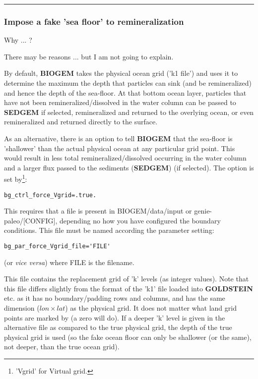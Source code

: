 %
\noindent\rule{4cm}{0.5pt}
\subsubsection{Impose a fake 'sea floor' to remineralization}
\vspace{1mm}

Why ... ?

\noindent There may be reasons ... but I am not going to explain.

By default, \textbf{BIOGEM} takes the physical ocean grid ('k1 file') and uses it to determine the maximum the depth that particles can sink (and be remineralized) and hence the depth of the sea-floor. At that bottom ocean layer, particles that have not been remineralized/dissolved in the water column can be passed to \textbf{SEDGEM} if selected, remineralized and returned to the overlying ocean, or even remineralized and returned directly to the surface.

As an alternative, there is an option to tell \textbf{BIOGEM} that the sea-floor is 'shallower' than the actual physical ocean at any particular grid point. This would result in less total remineralized/dissolved occurring in the water column and a larger flux passed to the sediments (\textbf{SEDGEM}) (if selected). The option is set by\footnote{'Vgrid' for Virtual grid.}:
\vspace{-1mm}\small\begin{verbatim}
bg_ctrl_force_Vgrid=.true.
\end{verbatim}\normalsize\vspace{-1mm}
This requires that a file is present in \footnotesize\textsf{BIOGEM/data/input }\normalsize or  \footnotesize\textsf{genie-paleo/[CONFIG]}\normalsize, depending no how you have configured the boundary conditions. This file must be named according the parameter setting:
\vspace{-1mm}\small\begin{verbatim}
bg_par_force_Vgrid_file='FILE'
\end{verbatim}\normalsize\vspace{-1mm}
(or \textit{vice versa}) where \footnotesize\textsf{FILE }\normalsize is the filename. 

This file contains the replacement grid of 'k' levels (as integer values). Note that this file differs slightly from the format of the 'k1' file loaded into \textbf{GOLDSTEIN} etc. as it has no boundary/padding rows and columns, and has the same dimension (\(lon\times lat\)) as the physical grid. It does not matter what land grid points are marked by (a zero will do). If a deeper 'k' level is given in the alternative file as compared to the true physical grid, the depth of the true physical grid is used (so the fake ocean floor can only be shallower (or the same), not deeper, than the true ocean grid).  

